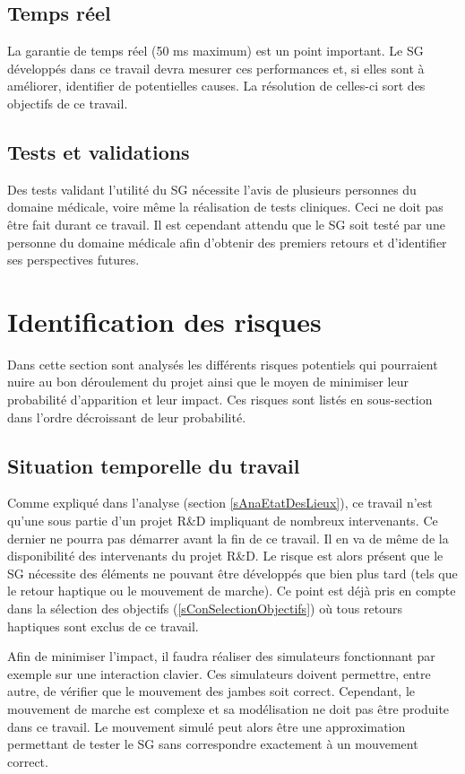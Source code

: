 	\subsection*{Temps réel}
		La garantie de temps réel (50 ms maximum) est un point important. Le SG développés dans ce travail devra mesurer ces performances et, si elles sont à améliorer, identifier de potentielles causes. La résolution de celles-ci sort des objectifs de ce travail.
	
	\subsection*{Tests et validations}
		Des tests validant l'utilité du SG nécessite l'avis de plusieurs personnes du domaine médicale, voire même la réalisation de tests cliniques. Ceci ne doit pas être fait durant ce travail. Il est cependant attendu que le SG soit testé par une personne du domaine médicale afin d'obtenir des premiers retours et d'identifier ses perspectives futures.

\section{Identification des risques}
	\label{sConIdentificationRisques}
	Dans cette section sont analysés les différents risques potentiels qui pourraient nuire au bon déroulement du projet ainsi que le moyen de minimiser leur probabilité d'apparition et leur impact. Ces risques sont listés en sous-section dans l'ordre décroissant de leur probabilité.
	
	\subsection*{Situation temporelle du travail}%
		Comme expliqué dans l'analyse (section \ref{sAnaEtatDesLieux}), ce travail n'est qu'une sous partie d'un projet R\&D impliquant de nombreux intervenants. Ce dernier ne pourra pas démarrer avant la fin de ce travail. Il en va de même de la disponibilité des intervenants du projet R\&D. Le risque est alors présent que le SG nécessite des éléments ne pouvant être développés que bien plus tard (tels que le retour haptique ou le mouvement de marche). Ce point est déjà pris en compte dans la sélection des objectifs (\ref{sConSelectionObjectifs}) où tous retours haptiques sont exclus de ce travail.
		
		Afin de minimiser l'impact, il faudra réaliser des simulateurs fonctionnant par exemple sur une interaction clavier. Ces simulateurs doivent permettre, entre autre, de vérifier que le mouvement des jambes soit correct. Cependant, le mouvement de marche est complexe et sa modélisation ne doit pas être produite dans ce travail. Le mouvement simulé peut alors être une approximation permettant de tester le SG sans correspondre exactement à un mouvement correct.
		
